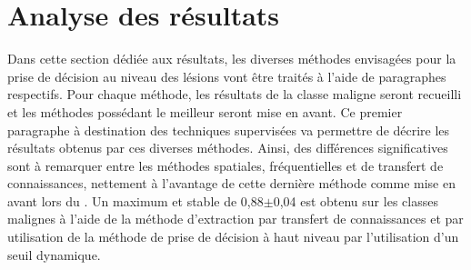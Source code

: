 \section{Analyse des résultats}
Dans cette section dédiée aux résultats, les diverses méthodes envisagées pour la prise de décision au niveau des lésions vont être traités à l'aide de paragraphes respectifs. Pour chaque méthode, les résultats de la classe maligne seront recueilli et les méthodes possédant le meilleur \fscore{} seront mise en avant. Ce premier paragraphe à destination des techniques supervisées va permettre de décrire les résultats obtenus par ces diverses méthodes. Ainsi, des différences significatives sont à remarquer entre les méthodes spatiales, fréquentielles et de transfert de connaissances, nettement à l'avantage de cette dernière méthode comme mise en avant lors du . Un \fscore{} maximum et stable de 0,88$\pm$0,04 est obtenu sur les classes malignes à l'aide de la méthode d'extraction par transfert de connaissances et par utilisation de la méthode de prise de décision à haut niveau par l'utilisation d'un seuil dynamique.\par

